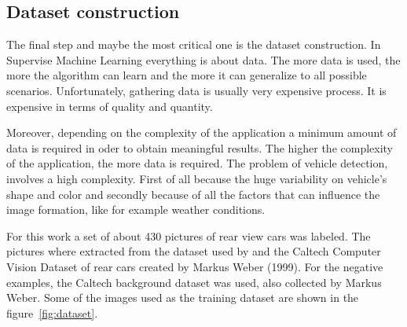 \subsection{Dataset construction} %
\label{sub:data-set}

The final step and maybe the most critical one is the dataset construction. In
Supervise Machine Learning everything is about data. The more data is used,
the more the algorithm can learn and the more it can generalize to all possible scenarios.
Unfortunately, gathering data is usually very expensive process. It is expensive
in terms of quality and quantity.

Moreover, depending on the complexity of the application a minimum amount of data 
is required in oder to obtain meaningful results. The higher the complexity of the 
application, the more data is required. The problem of vehicle detection,
involves a high complexity. First of all because the huge variability on
vehicle's shape and color and secondly because of all the factors that can
influence the image formation, like for example weather conditions.

For this work a set of about 430 pictures of rear view cars was labeled. The
pictures where extracted from the dataset used by \cite{tme} and the Caltech
Computer Vision Dataset of rear cars created by Markus Weber (1999). For the
negative examples, the Caltech background dataset was used, also collected by
Markus Weber. Some of the images used as the training dataset are shown in 
the figure~\ref{fig:dataset}.


